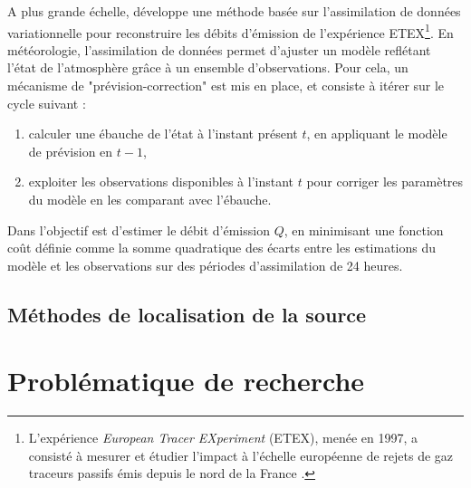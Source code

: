 	 A plus grande échelle, \cite{Robertson1998} développe une méthode basée sur l'assimilation de données variationnelle pour reconstruire les débits d'émission de l'expérience ETEX\footnote{L’expérience \textit{European Tracer EXperiment} (ETEX), menée en 1997,  a consisté à mesurer et étudier l'impact à l'échelle européenne de rejets de gaz traceurs passifs émis depuis le nord de la France \cite{Nodop1998}.}. En météorologie, l'assimilation de données permet d'ajuster un modèle reflétant l'état de l'atmosphère grâce à un ensemble d'observations. Pour cela, un mécanisme de "prévision-correction" est mis en place, et consiste à itérer sur le cycle suivant :
	 \begin{enumerate}
	 	\item calculer une ébauche de l'état à l'instant présent $t$, en appliquant le modèle de prévision en $t-1$,
	 	\item exploiter les observations disponibles à l'instant $t$ pour corriger les paramètres du modèle en les comparant avec l'ébauche.
	 \end{enumerate}
	 
	 Dans \cite{Robertson1998} l'objectif est d'estimer le débit d'émission $Q$, en minimisant une fonction coût définie comme la somme quadratique des écarts entre les estimations du modèle et les observations sur des périodes d'assimilation de 24 heures. 
	
	\subsection{Méthodes de localisation de la source}
		
	\section{Problématique de recherche}
	
	